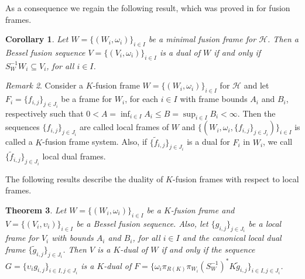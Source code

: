 \documentclass{birkjour}
\newtheorem{thm}{Theorem}[section]
\newtheorem{cor}[thm]{Corollary}
\theoremstyle{definition}
\theoremstyle{remark}
\newtheorem{rem}[thm]{Remark}
\numberwithin{equation}{section}
\begin{document}
As a consequence we regain the following result, which was  proved in  \cite{arefi1} for fusion frames. 
\begin{cor}
Let $W = \lbrace (W_{i}, \omega_{i})\rbrace_{i\in I}$ be a minimal fusion frame for $\mathcal{H}$. Then a Bessel fusion sequence $V = \lbrace (V_{i}, \omega_{i})\rbrace_{i\in I}$ is a dual of $W$ if and only if $S_{W}^{-1}W_{i} \subseteq V_{i}$, for all $i\in I$.
\end{cor}
\begin{rem}\label{1212}
Consider a $K$-fusion frame $W = \lbrace (W_{i}, \omega_{i})\rbrace_{i\in I}$
 for $\mathcal{H}$ and let $F_{i} = \{f_{i,j}\}_{j\in J_{i}}$ be a frame for $W_{i}$, for each $i\in I$ with frame bounds $A_{i}$ and $B_{i}$, respectively such that $0<A = \inf_{i\in I}A_{i} \leq B = \sup_{i\in I}B_{i} <\infty$. Then the sequences $\{f_{i,j}\}_{j\in J_{i}}$  are called local frames of $W$ and $\{(W_{i},  \omega_{i}, \{f_{i,j}\}_{j\in J_{i}})\}_{i\in I}$ is called a $K$-fusion frame system. Also, if $\{\widetilde{f}_{i,j}\}_{j\in J_{i}}$ is a dual for $F_{i}$ in $W_{i}$, we call $\{\widetilde{f}_{i,j}\}_{j\in J_{i}}$  local dual frames.
\end{rem}
The following results describe the duality of $K$-fusion frames with
respect to local frames.
 \begin{thm}\label{3.8} Let $W = \lbrace (W_{i},
\omega_{i})\rbrace_{i\in I} $ be a $K$-fusion frame  and $V = \lbrace (V_{i},
\upsilon_{i})\rbrace_{i\in I}$ be a Bessel fusion sequence. Also,  let  $\lbrace
g_{i,j}\rbrace_{j\in J_{i}}$ be a local frame for $V_{i}$ with bounds $A_{i}$ and
$B_{i}$, for all $i\in I$ and the canonical local  dual frame $\lbrace \widetilde{g}_{i,j}\rbrace_{j\in J_{i}}$. Then $V$
is  a $K$-dual of $W$ if and only if   the sequence $G = \lbrace
\upsilon_{i}g_{i,j}\rbrace_{i\in I, j\in J_{i}}$ is a $K$-dual of $F
= \lbrace  \omega_{i} \pi_{R(K)}\pi_{W_{i}}(S_{W}^{-1})^{*}K\widetilde{g}_{i,j}\rbrace_{i\in I,
j\in J_{i}}$.\end{thm}
\end{document}
